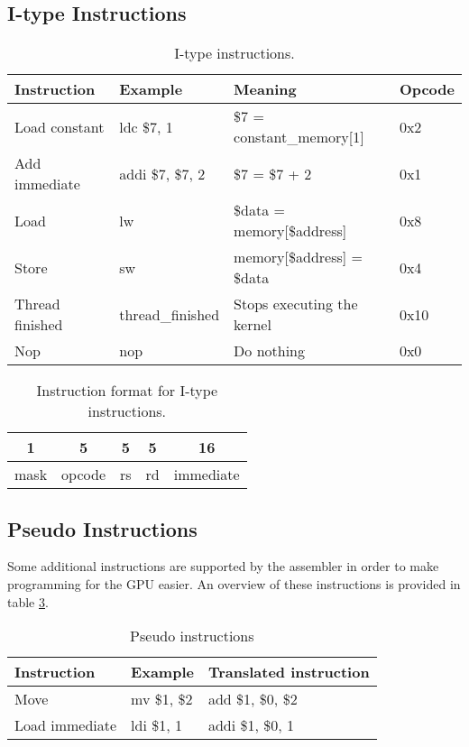 \documentclass[../main/report.tex]{subfiles}
\begin{document}
\subsection{I-type Instructions}
\begin{table}[H]
    \centering
    \begin{tabular}{llll}
        \textbf{Instruction} & \textbf{Example} & \textbf{Meaning}          & \textbf{Opcode} \\
        \hline
        \hline
         Load constant       & ldc \$7, 1       & \$7 = constant\_memory[1]  & 0x2 \\
         Add immediate       & addi \$7, \$7, 2 & \$7 = \$7 + 2              & 0x1 \\ \hline
         Load                & lw               & \$data = memory[\$address] & 0x8 \\
         Store               & sw               & memory[\$address] = \$data & 0x4 \\ \hline
         Thread finished     & thread\_finished & Stops executing the kernel & 0x10 \\
         Nop                 & nop              & Do nothing                 & 0x0 \\
    \end{tabular}
    \caption{I-type instructions.}
    \label{table:i_type_instructions}
\end{table}

\begin{table}[H]
    \centering
    \begin{tabular}{|c|c|c|c|c|}
    \multicolumn{1}{c}{1} & \multicolumn{1}{c}{5} & \multicolumn{1}{c}{5}  & \multicolumn{1}{c}{5}  & \multicolumn{1}{c}{16} \\ \hline
    mask & opcode & rs & rd & immediate \\ \hline
    \end{tabular}
    \caption{Instruction format for I-type instructions.}
    \label{table:i_type_format}
\end{table}

\subsection{Pseudo Instructions}

Some additional instructions are supported by the assembler in order to make programming for the GPU easier.
An overview of these instructions is provided in table \ref{table:pseudo_instructions}.

\begin{table}[H]
    \centering
    \begin{tabular}{lll}
        \textbf{Instruction} & \textbf{Example} & \textbf{Translated instruction} \\
        \hline
        \hline
         Move                & mv \$1, \$2      & add \$1, \$0, \$2               \\
         Load immediate      & ldi \$1, 1       & addi \$1, \$0, 1                \\
    \end{tabular}
    \caption{Pseudo instructions}
    \label{table:pseudo_instructions}
\end{table}
\end{document}

